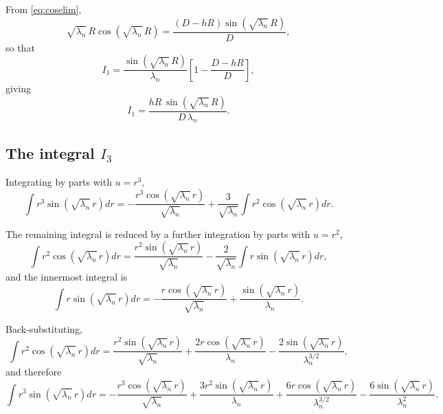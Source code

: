 \documentclass[11pt,a4paper]{article}
\begin{document}
From \eqref{eq:coselim},
\begin{equation}
\sqrt{\lambda_{n}}\,R\cos\!\left(\sqrt{\lambda_{n}}\,R\right)
= \frac{\left(D - hR\right)\sin\!\left(\sqrt{\lambda_{n}}\,R\right)}{D} ,
\end{equation}
so that
\begin{equation}
I_{1}
= \frac{\sin\!\left(\sqrt{\lambda_{n}}\,R\right)}{\lambda_{n}}
\left[1 - \frac{D - hR}{D}\right] ,
\end{equation}
giving
\begin{equation}
\boxed{\;
I_{1} = \frac{hR\,\sin\!\left(\sqrt{\lambda_{n}}\,R\right)}{D\,\lambda_{n}} .
\;}
\label{eq:I1}
\end{equation}

\subsection{The integral \texorpdfstring{$I_{3}$}{I3}}

Integrating by parts with $u = r^{3}$,
\begin{equation}
\int r^{3}\sin\!\left(\sqrt{\lambda_{n}}\,r\right) dr
= -\frac{r^{3}\cos\!\left(\sqrt{\lambda_{n}}\,r\right)}{\sqrt{\lambda_{n}}}
+ \frac{3}{\sqrt{\lambda_{n}}}\int r^{2}\cos\!\left(\sqrt{\lambda_{n}}\,r\right) dr .
\end{equation}

The remaining integral is reduced by a further integration by parts with $u = r^{2}$,
\begin{equation}
\int r^{2}\cos\!\left(\sqrt{\lambda_{n}}\,r\right) dr
= \frac{r^{2}\sin\!\left(\sqrt{\lambda_{n}}\,r\right)}{\sqrt{\lambda_{n}}}
- \frac{2}{\sqrt{\lambda_{n}}}\int r\sin\!\left(\sqrt{\lambda_{n}}\,r\right) dr ,
\end{equation}
and the innermost integral is
\begin{equation}
\int r\sin\!\left(\sqrt{\lambda_{n}}\,r\right) dr
= -\frac{r\cos\!\left(\sqrt{\lambda_{n}}\,r\right)}{\sqrt{\lambda_{n}}}
+ \frac{\sin\!\left(\sqrt{\lambda_{n}}\,r\right)}{\lambda_{n}} .
\end{equation}

Back-substituting,
\begin{equation}
\int r^{2}\cos\!\left(\sqrt{\lambda_{n}}\,r\right) dr
= \frac{r^{2}\sin\!\left(\sqrt{\lambda_{n}}\,r\right)}{\sqrt{\lambda_{n}}}
+ \frac{2r\cos\!\left(\sqrt{\lambda_{n}}\,r\right)}{\lambda_{n}}
- \frac{2\sin\!\left(\sqrt{\lambda_{n}}\,r\right)}{\lambda_{n}^{3/2}} ,
\end{equation}
and therefore
\begin{equation}
\int r^{3}\sin\!\left(\sqrt{\lambda_{n}}\,r\right) dr
= -\frac{r^{3}\cos\!\left(\sqrt{\lambda_{n}}\,r\right)}{\sqrt{\lambda_{n}}}
+ \frac{3r^{2}\sin\!\left(\sqrt{\lambda_{n}}\,r\right)}{\lambda_{n}}
+ \frac{6r\cos\!\left(\sqrt{\lambda_{n}}\,r\right)}{\lambda_{n}^{3/2}}
- \frac{6\sin\!\left(\sqrt{\lambda_{n}}\,r\right)}{\lambda_{n}^{2}} .
\end{equation}
\end{document}
